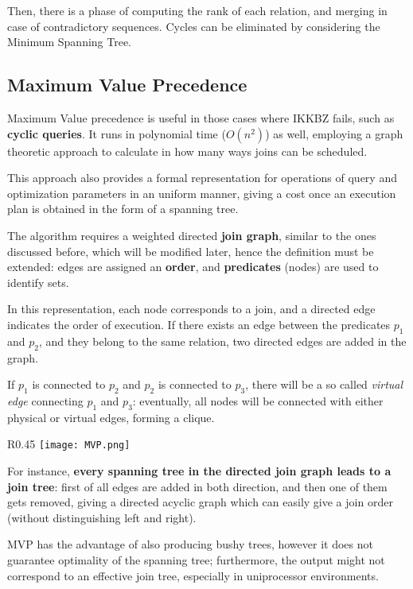 Then, there is a phase of computing the rank of each relation, and merging in case of contradictory sequences. Cycles can be eliminated by considering the Minimum Spanning Tree.

\subsection{Maximum Value Precedence}
Maximum Value precedence is useful in those cases where IKKBZ fails, such as \textbf{cyclic queries}. It runs in polynomial time ($O(n^2)$) as well, employing a graph theoretic approach to calculate in how many ways joins can be scheduled.

This approach also provides a formal representation for operations of query and optimization parameters in an uniform manner, giving a cost once an execution plan is obtained in the form of a spanning tree.

The algorithm requires a weighted directed \textbf{join graph}, similar to the ones discussed before, which will be modified later, hence the definition must be extended: edges are assigned an \textbf{order}, and \textbf{predicates} (nodes) are used to identify sets.

In this representation, each node corresponds to a join, and a directed edge indicates the order of execution. If there exists an edge between the predicates $p_1$ and $p_2$, and they belong to the same relation, two directed edges are added in the graph.  

If $p_1$ is connected to $p_2$ and $p_2$ is connected to $p_3$, there will be a so called \textit{virtual edge} connecting $p_1$ and $p_3$: eventually, all nodes will be connected with either physical or virtual edges, forming a clique.

\begin{wrapfigure}{R}{0.45\textwidth}
	\vspace{-20pt}
	\texttt{[image: MVP.png]}
	\vspace{-30pt}
\end{wrapfigure}

For instance, \textbf{every spanning tree in the directed join graph leads to a join tree}: first of all edges are added in both direction, and then one of them gets removed, giving a directed acyclic graph which can easily give a join order (without distinguishing left and right).

MVP has the advantage of also producing bushy trees, however it does not guarantee optimality of the spanning tree; furthermore, the output might not correspond to an effective join tree, especially in uniprocessor environments.

